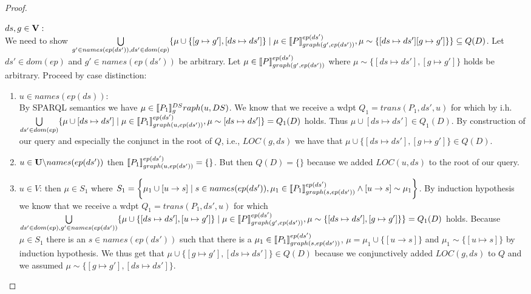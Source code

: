 \begin{proof}
\begin{enumerate}
			\bigskip\noindent
			$ds,g \in \mathbf{V}:$ \\
			We need to show 
			$\bigcup\limits_{g' \in names(ep(ds')), ds' \in dom(ep)} \{ \mu \cup
				\{[g \mapsto g'],[ds \mapsto ds']\} \mid \mu \in
				\llbracket P\rrbracket^{ep(ds')}_{graph(g',ep(ds'))}, \mu \sim
			\{[ds \mapsto ds'][g\mapsto g']\} \}  \subseteq Q(D) $.
			Let  $ds' \in dom(ep)$ and $g' \in names(ep(ds'))$ be arbitrary.
			Let $\mu \in \llbracket P \rrbracket^{ep(ds')}_{graph(g',ep(ds'))}$ where $\mu
			\sim\{[ds\mapsto ds'], [g\mapsto g'] \}$ holds be arbitrary.
			Proceed by case distinction:
			\begin{enumerate}
				\item $u \in names(ep(ds))$:\\
					By SPARQL semantics we have $\mu \in \llbracket P_1
					\rrbracket^{DS}_graph(u,DS)$.
					We know that we receive a wdpt $Q_1	= trans(P_1,ds',u)$ 
					for which by i.h.
					$\bigcup\limits_{ds' \in dom(ep)} \{ \mu \cup [ds \mapsto ds'] \mid \mu \in
						\llbracket P_1\rrbracket^{ep(ds')}_{graph(u,ep(ds'))}, \mu \sim
					[ds\mapsto ds'] \}  = Q_1(D) $
					holds. Thus $\mu \cup [ds \mapsto ds'] \in Q_1(D)$.
					By construction of our query and especially the conjunct in the
					root of $Q$, i.e., $LOC(g,ds)$ we have that $\mu \cup
					\{[ds\mapsto ds'],[g \mapsto g']\} \in Q(D)$.

				\item $u \in \mathbf{U} \backslash names(ep(ds'))$
					then $\llbracket P_1 \rrbracket^{ep(ds')}_{graph(u,ep(ds'))} = \{\}$. But then
					$Q(D) = \{\}$ because we added $LOC(u,ds)$ to the root of
					our query. 

				\item $u \in V$:
					then $\mu \in S_1$ where $S_1 =  \bigg\{\mu_1 \cup [ u \rightarrow s ]
						\mid s \in names(ep(ds')),\\ \mu_1 \in \llbracket P_1
						\rrbracket^{ep(ds')}_{graph(s,ep(ds'))} \land [ u \rightarrow s ] \sim
					\mu_1 \bigg\}$. 
					By induction hypothesis we know that we receive a wdpt $Q_1
					= trans(P_1,ds',u)$ for which \\
					$\bigcup\limits_{ds' \in dom(ep), g' \in names(ep(ds'))} \{ \mu
						\cup \{[ds \mapsto ds'],[u \mapsto g']\} \mid \\ \mu \in
						\llbracket P\rrbracket^{ep(ds')}_{graph(g',ep(ds'))}, 
					\mu \sim \{[ds\mapsto ds'], [g \mapsto g']\}\} = Q_1(D) $
					holds. Because $\mu \in S_1$ there
					is an $s \in names(ep(ds'))$ such  that there is a $\mu_1 \in \llbracket P_1
					\rrbracket^{ep(ds')}_{graph(s,ep(ds'))}$, $\mu = \mu_1 \cup \{[u \rightarrow
					s]\}$ and  $\mu_1 \sim \{[u \mapsto s]\}$ by induction hypothesis. 
					We thus get that $\mu\cup \{[g\mapsto g'],[ds \mapsto ds']\} \in Q(D)$ because we
					conjunctively added $LOC(g,ds)$ to $Q$ and we assumed $\mu
					\sim \{[g\mapsto g'],[ds \mapsto ds']\}$.
			\end{enumerate}


\end{enumerate}
\end{proof}
